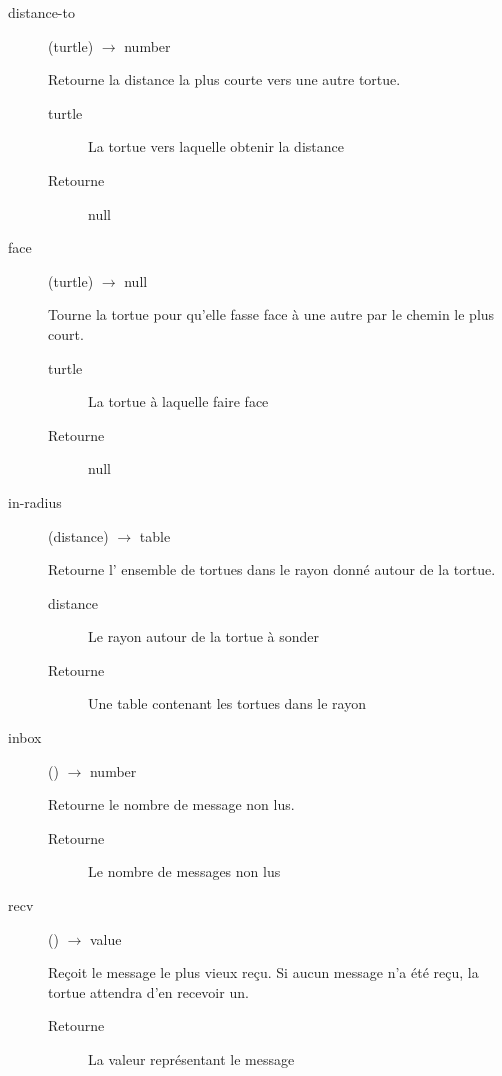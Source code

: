 \begin{description}
	\item[distance-to] (turtle) $\rightarrow$ number

	Retourne la distance la plus courte vers une autre tortue.

	\begin{description}
		\item[turtle] La tortue vers laquelle obtenir la distance
		\item[Retourne] null
	\end{description}

	\item[face] (turtle) $\rightarrow$ null

	Tourne la tortue pour qu'elle fasse face à une autre par le chemin le plus court.

	\begin{description}
		\item[turtle] La tortue à laquelle faire face
		\item[Retourne] null
	\end{description}

	\item[in-radius] (distance) $\rightarrow$ table

	Retourne l' ensemble de tortues dans le rayon donné autour de la tortue.

	\begin{description}
		\item[distance] Le rayon autour de la tortue à sonder
		\item[Retourne] Une table contenant les tortues dans le rayon
	\end{description}

	\item[inbox] () $\rightarrow$ number

	Retourne le nombre de message non lus.

	\begin{description}
		\item[Retourne] Le nombre de messages non lus
	\end{description}

	\item[recv] () $\rightarrow$ value

	Reçoit le message le plus vieux reçu. Si aucun message n'a été reçu, la tortue attendra d'en recevoir un.

	\begin{description}
		\item[Retourne] La valeur représentant le message
	\end{description}


\end{description}
